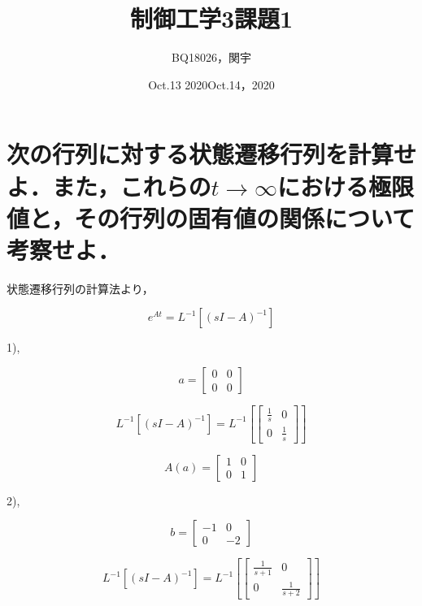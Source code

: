 \documentclass[twocolumn,xelatex,ja=standard,jafont=noto]{bxjsarticle}
\date{Oct.13 2020}
\title{制御工学3課題1	}
\author{BQ18026，関宇 }
\date{Oct.14，2020}
\begin{document}
		\maketitle
		



\section{次の行列に対する状態遷移行列を計算せよ．また，これらの$ t\to \infty $における極限値と，その行列の固有値の関係について考察せよ．}

状態遷移行列の計算法より，

	\begin{equation}
e^{At}=L^{-1}[(sI-A)^{-1}]
	\end{equation}
	
	1),
	
	\begin{equation}
	    a={
\left[ \begin{array}{cc}
0&0\\
0&0
\end{array}
\right ]}
	\end{equation}
	
	
\begin{equation}
L^{-1}[(sI-A)^{-1}]=L^{-1}[
	    {
\left[ \begin{array}{cc}
\frac{1}{s}&0\\
0&\frac{1}{s}
\end{array}
\right ]}
	]
\end{equation}

\begin{equation}
	    A(a)={
\left[ \begin{array}{cc}
1&0\\
0&1
\end{array}
\right ]}
	\end{equation}
	
	
	2),
	
		\begin{equation}
	    b={
\left[ \begin{array}{cc}
-1&0\\
0&-2
\end{array}
\right ]}
	\end{equation}
	
	
	\begin{equation}
L^{-1}[(sI-A)^{-1}]=L^{-1}[
	    {
\left[ \begin{array}{cc}
\frac{1}{s+1}&0\\
0&\frac{1}{s+2}
\end{array}
\right ]}
	]
\end{equation}
\end{document}
